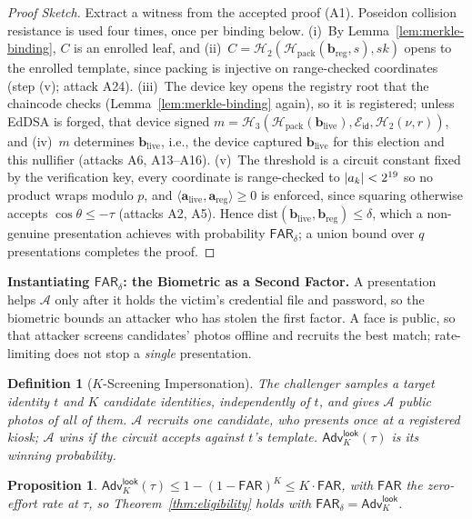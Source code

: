 \documentclass[10pt,letterpaper,journal]{IEEEtran}
\newtheorem{definition}[theorem]{Definition}
\newtheorem{proposition}[theorem]{Proposition}
\begin{document}
\begin{proof}[Proof Sketch]
Extract a witness from the accepted proof (A1). Poseidon collision resistance is used four times, once per binding below. (i)~By Lemma~\ref{lem:merkle-binding}, $C$ is an enrolled leaf, and (ii)~$C = \mathcal{H}_2(\mathcal{H}_{\text{pack}}(\mathbf{b}_{\text{reg}}, s), sk)$ opens to the enrolled template, since packing is injective on range-checked coordinates (step (v); attack A24). (iii)~The device key opens the registry root that the chaincode checks (Lemma~\ref{lem:merkle-binding} again), so it is registered; unless EdDSA is forged, that device signed $m = \mathcal{H}_3(\mathcal{H}_{\text{pack}}(\mathbf{b}_{\text{live}}), \mathcal{E}_{\mathsf{id}}, \mathcal{H}_2(\nu, r))$, and (iv)~$m$ determines $\mathbf{b}_{\text{live}}$, i.e., the device captured $\mathbf{b}_{\text{live}}$ for this election and this nullifier (attacks A6, A13--A16). (v)~The threshold is a circuit constant fixed by the verification key, every coordinate is range-checked to $|a_k| < 2^{19}$ so no product wraps modulo $p$, and $\langle \mathbf{a}_{\text{live}}, \mathbf{a}_{\text{reg}}\rangle \geq 0$ is enforced, since squaring otherwise accepts $\cos\theta \le -\tau$ (attacks A2, A5). Hence $\mathrm{dist}(\mathbf{b}_{\text{live}}, \mathbf{b}_{\text{reg}}) \le \delta$, which a non-genuine presentation achieves with probability $\mathsf{FAR}_\delta$; a union bound over $q$ presentations completes the proof.
\end{proof}

\textbf{Instantiating $\mathsf{FAR}_\delta$: the Biometric as a Second Factor.} A presentation helps $\mathcal{A}$ only after it holds the victim's credential file and password, so the biometric bounds an attacker who has stolen the first factor. A face is public, so that attacker screens candidates' photos offline and recruits the best match; rate-limiting does not stop a \emph{single} presentation.

\begin{definition}[$K$-Screening Impersonation]
\label{def:lookalike}
The challenger samples a target identity $t$ and $K$ candidate identities, independently of $t$, and gives $\mathcal{A}$ public photos of all of them. $\mathcal{A}$ recruits one candidate, who presents once at a registered kiosk; $\mathcal{A}$ wins if the circuit accepts against $t$'s template. $\mathsf{Adv}^{\mathsf{look}}_K(\tau)$ is its winning probability.
\end{definition}

\begin{proposition}
\label{prop:lookalike}
$\mathsf{Adv}^{\mathsf{look}}_K(\tau) \le 1 - (1 - \mathsf{FAR})^K \le K \cdot \mathsf{FAR}$, with $\mathsf{FAR}$ the zero-effort rate at $\tau$, so Theorem~\ref{thm:eligibility} holds with $\mathsf{FAR}_\delta = \mathsf{Adv}^{\mathsf{look}}_K$.
\end{proposition}
\end{document}
